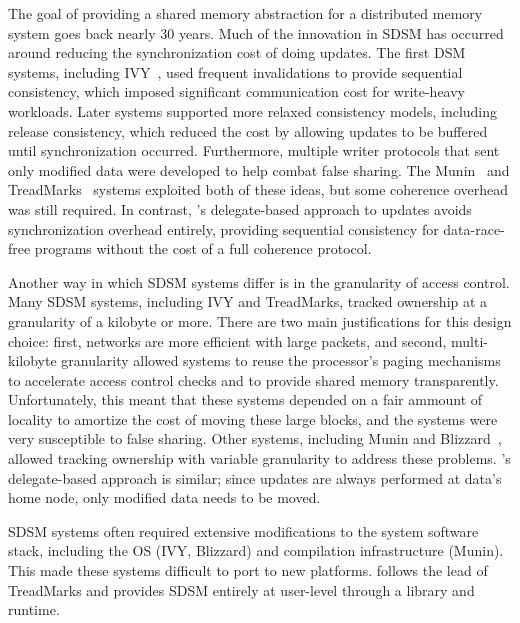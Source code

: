 \vspace{0.5ex}
The goal of providing a shared memory abstraction for a distributed
memory system goes back nearly 30 years. Much of the innovation in SDSM has occurred around reducing the
synchronization cost of doing updates. The first DSM systems,
including IVY~\cite{Li:1989:MCS:75104.75105}, used frequent invalidations to
provide sequential consistency, which imposed significant
communication cost for write-heavy workloads.  Later systems supported
more relaxed consistency models, including release consistency, which
reduced the cost by allowing updates to be buffered until
synchronization occurred. Furthermore, multiple writer protocols that
sent only modified data were developed to help combat false
sharing. The
Munin~\cite{Bennett:1990:MDS:99163.99182,Carter:1991:IPM:121132.121159}
and TreadMarks~\cite{Keleher:1994:TDS:1267074.1267084} systems
exploited both of these ideas, but some coherence overhead was still
required. In contrast, \Grappa's delegate-based approach to updates
avoids synchronization overhead entirely, providing sequential
consistency for data-race-free programs without the cost of a
full coherence protocol. 


Another way in which SDSM systems differ is in the granularity of
access control. Many SDSM systems, including IVY and TreadMarks,
tracked ownership at a granularity of a kilobyte or more. There are
two main justifications for this design choice: first, networks are
more efficient with large packets, and second, multi-kilobyte
granularity allowed systems to reuse the processor's paging mechanisms
to accelerate access control checks and to provide shared memory
transparently. Unfortunately, this meant that these systems depended
on a fair ammount of locality to amortize the cost of moving these large
blocks, and the systems were very susceptible to false sharing. Other
systems, including Munin and
Blizzard~\cite{Schoinas:1994:FAC:195473.195575}, allowed tracking
ownership with variable granularity to address these problems.
\Grappa's delegate-based approach is similar; since updates are always
performed at data's home node, only modified data needs to be moved.


SDSM systems often required extensive modifications to the system
software stack, including the OS (IVY, Blizzard) and compilation
infrastructure (Munin). This made these systems difficult to port to
new platforms. \Grappa follows the lead of TreadMarks and provides
SDSM entirely at user-level through a library and runtime.

